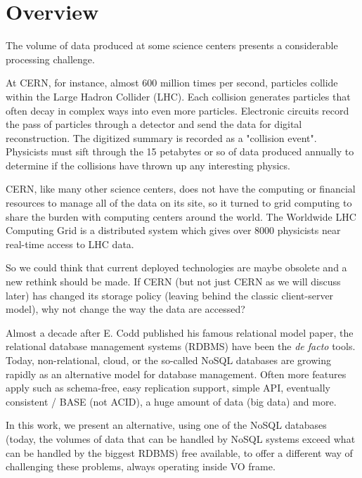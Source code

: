\chapter{Overview}


The volume of data produced at some science centers presents a considerable processing challenge.\newline

At CERN, for instance, almost 600 million times per second, particles collide within the Large Hadron Collider (LHC). Each collision generates particles that often decay in complex ways into even more particles. Electronic circuits record the pass of particles through a detector and send the data for digital reconstruction. The digitized summary is recorded as a "collision event". Physicists must sift through the 15 petabytes or so of data produced annually to determine if the collisions have thrown up any interesting physics.  \newline

CERN, like many other science centers, does not have the computing or financial resources to manage all of the data on its site, so it turned to grid computing to share the burden with computing centers around the world. The Worldwide LHC Computing Grid is a distributed system which gives over 8000 physicists near real-time access to LHC data.  \newline

So we could think that current deployed technologies are maybe obsolete and a new rethink should be made. If CERN (but not just CERN as we will discuss later) has changed its storage policy (leaving behind the classic client-server model), why not change the way the data are accessed?  \newline

Almost a decade after E. Codd published his famous relational model paper, the relational database management systems (RDBMS) have been the \textit{de facto} tools. Today, non-relational, cloud, or the so-called NoSQL databases are growing rapidly as an alternative model for database management. Often more features apply such as schema-free, easy replication support, simple API, eventually consistent / BASE (not ACID), a huge amount of data (big data) and more. \newline

In this work, we present an alternative, using one of the NoSQL databases (today, the volumes of data that can be handled by NoSQL systems exceed what can be handled by the biggest RDBMS) free available, to offer a different way of challenging these problems, always operating inside VO frame.